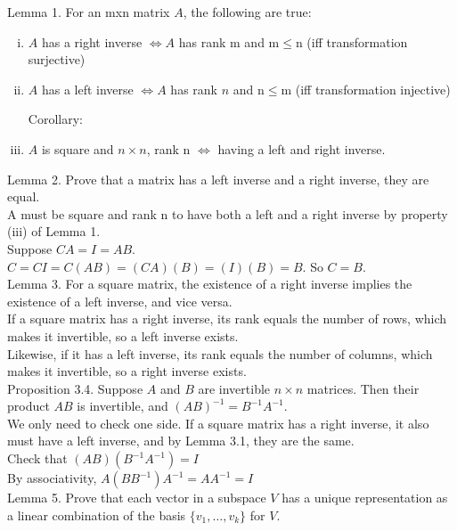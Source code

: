 \documentclass[12pt]{article}
\begin{document}
Lemma 1. For an mxn matrix $A$, the following are true:
\begin{enumerate}[(i)]
\item $A$ has a right inverse $\Leftrightarrow A$ has rank m and m$\leq$n (iff transformation surjective)
\item $A$ has a left inverse $\Leftrightarrow A$ has rank $n$ and n$\leq$m (iff transformation injective)

Corollary:
\item  $A$ is square and $n \times n$, rank n $\Leftrightarrow$ having a left and right inverse. \\
\end{enumerate}

Lemma 2. Prove that a matrix has a left inverse and a right inverse, they are equal.\\
A must be square and rank n to have both a left and a right inverse by property (iii) of Lemma 1.\\
Suppose $CA = I = AB$.\\ 
$C = CI = C(AB) = (CA)(B) = (I)(B) = B$. So $C = B$.\\

Lemma 3. For a square matrix, the existence of a right inverse implies the existence of a left inverse, and vice versa. \\
If a square matrix has a right inverse, its rank equals the number of rows, which makes it invertible, so a left inverse exists.\\
Likewise, if it has a left inverse, its rank equals the number of columns, which makes it invertible, so a right inverse exists.\\

Proposition 3.4. Suppose $A$ and $B$ are invertible $n \times n$ matrices. Then their product $AB$
is invertible, and $(AB)^{-1} = B^{-1}A^{-1}$.\\
We only need to check one side. If a square matrix has a right inverse, it also must have a left inverse, and by Lemma 3.1, they are the same.\\
Check that $(AB)( B^{-1}A^{-1}) = I$\\
By associativity, $A(BB^{-1})A^{-1} = AA^{-1} = I$\\

Lemma 5. Prove that each vector in a subspace $V$ has a unique representation as a linear combination of the basis $\{v_1, \ldots, v_k\}$ for $V$.
\end{document}
